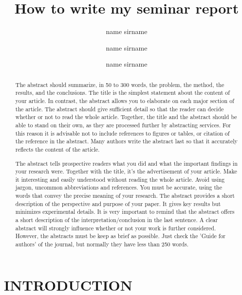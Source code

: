 \documentclass[a4paper, 10pt, conference]{ieeeconf}      %
\title{\huge \bf
How to write my seminar report
}
\author[ ]{name sirname}
\author[ ]{name sirname}
\author[ ]{name sirname}
\affil[ ]{\textit{Remote Sensing Laboratories, Department of Geography, University of Zurich}}
\begin{document}


\maketitle
\thispagestyle{plain}
\pagestyle{plain}


\begin{abstract}

The abstract should summarize, in 50 to 300 words, the problem, the method, the results, and the conclusions. The title is the simplest statement about the content of your article. In contrast, the abstract allows you to elaborate on each major section of the article. The abstract should give sufficient detail so that the reader can decide whether or not to read the whole article. Together, the title and the abstract should be able to stand on their own, as they are processed further by abstracting services. For this reason it is advisable not to include references to figures or tables, or citation of the reference in the abstract. Many authors write the abstract last so that it accurately reflects the content of the article.

The abstract tells prospective readers what you did and what the important findings in your research were. Together with the title, it's the advertisement of your article. Make it interesting and easily understood without reading the whole article. Avoid using jargon, uncommon abbreviations and references. You must be accurate, using the words that convey the precise meaning of your research. The abstract provides a short description of the perspective and purpose of your paper. It gives key results but minimizes experimental details. It is very important to remind that the abstract offers a short description of the interpretation/conclusion in the last sentence. A clear abstract will strongly influence whether or not your work is further considered. However, the abstracts must be keep as brief as possible. Just check the 'Guide for authors' of the journal, but normally they have less than 250 words.


\end{abstract}


\section{INTRODUCTION}
\end{document}
